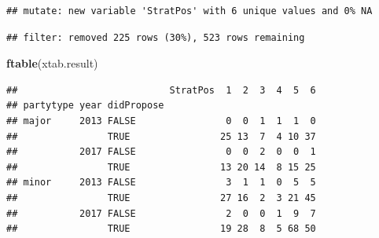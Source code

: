 \documentclass[]{article}
\newenvironment{Shaded}{\begin{snugshade}}{\end{snugshade}}
\newcommand{\CommentTok}[1]{\textcolor[rgb]{0.56,0.35,0.01}{\textit{#1}}}
\newcommand{\DataTypeTok}[1]{\textcolor[rgb]{0.13,0.29,0.53}{#1}}
\newcommand{\KeywordTok}[1]{\textcolor[rgb]{0.13,0.29,0.53}{\textbf{#1}}}
\newcommand{\NormalTok}[1]{#1}
\newcommand{\OperatorTok}[1]{\textcolor[rgb]{0.81,0.36,0.00}{\textbf{#1}}}
\newcommand{\OtherTok}[1]{\textcolor[rgb]{0.56,0.35,0.01}{#1}}
\newcommand{\StringTok}[1]{\textcolor[rgb]{0.31,0.60,0.02}{#1}}
\begin{document}
\begin{verbatim}
## mutate: new variable 'StratPos' with 6 unique values and 0% NA
\end{verbatim}

\begin{Shaded}
\end{Shaded}

\begin{verbatim}
## filter: removed 225 rows (30%), 523 rows remaining
\end{verbatim}

\begin{Shaded}
\begin{Highlighting}[]
\KeywordTok{ftable}\NormalTok{(xtab.result)}
\end{Highlighting}
\end{Shaded}

\begin{verbatim}
##                           StratPos  1  2  3  4  5  6
## partytype year didPropose                           
## major     2013 FALSE                0  0  1  1  1  0
##                TRUE                25 13  7  4 10 37
##           2017 FALSE                0  0  2  0  0  1
##                TRUE                13 20 14  8 15 25
## minor     2013 FALSE                3  1  1  0  5  5
##                TRUE                27 16  2  3 21 45
##           2017 FALSE                2  0  0  1  9  7
##                TRUE                19 28  8  5 68 50
\end{verbatim}

\begin{Shaded}
\end{Shaded}
\end{document}
